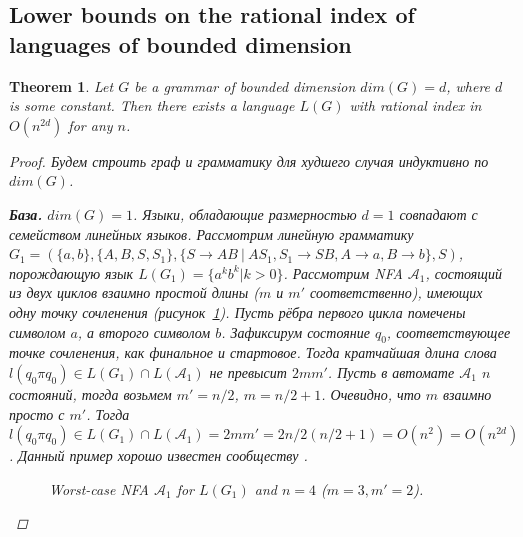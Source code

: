 \documentclass[11pt,a4paper]{article} %
\newtheorem{theorem}{Theorem}
\begin{document}
\subsection{Lower bounds on the rational index of languages of bounded dimension}
\begin{theorem} Let $G$ be a grammar of bounded dimension $dim(G) = d$, where $d$ is some constant. Then there exists a language $L(G)$ with rational index in $O(n^{2d})$ for any $n$.
\begin{proof} Будем строить граф и грамматику для худшего случая индуктивно по $dim(G)$.

\textbf{База.} $dim(G) = 1$.
Языки, обладающие размерностью $d = 1$ совпадают с семейством линейных языков. Рассмотрим линейную грамматику $G_1=(\{a, b\}, \{A, B, S, S_1\}, \{S \rightarrow AB\ |\ AS_1, S_1 \rightarrow SB, A \rightarrow a, B \rightarrow b\}, S)$, порождающую язык $L(G_1) = \{a^kb^k \vert k > 0\}$. Рассмотрим NFA $\mathcal{A}_1$, состоящий из двух циклов взаимно простой длины ($m$ и $m'$ соответственно), имеющих одну точку сочленения (рисунок~\ref{worstd_1}). Пусть рёбра первого цикла помечены символом $a$, а второго символом $b$.  Зафиксирум состояние $q_0$, соответствующее точке сочленения, как финальное и стартовое. Тогда кратчайшая длина слова $l(q_0\pi q_0) \in L(G_1) \cap L(\mathcal{A}_1)$ не превысит $2mm'$. Пусть в автомате $\mathcal{A}_1$ $n$ состояний, тогда возьмем $m' = n/2$, $m = n/2 + 1$. Очевидно, что $m$ взаимно просто с $m'$. Тогда $l(q_0\pi q_0) \in L(G_1) \cap L(\mathcal{A}_1) = 2mm' = 2n/2(n/2 + 1) = O(n^2) = O(n^{2d})$. Данный пример хорошо известен сообществу \cite{HellingsCFPQ, Yannakakis}. 


\begin{figure}[h]
    \centering        

\caption{Worst-case NFA $\mathcal{A}_1$ for $L(G_1)$ and $n=4$ ($m = 3, m' = 2$). }
\label{worstd_1}
\end{figure}


\end{proof}
\end{theorem}
\end{document}
